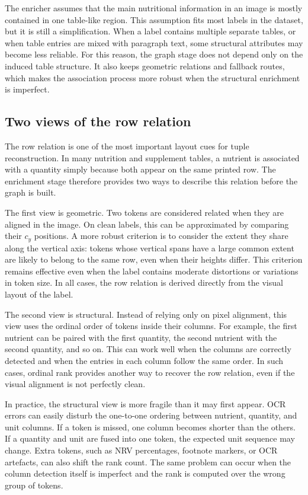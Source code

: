 The enricher assumes that the main nutritional information in an image is mostly contained in one table-like region. This assumption fits most labels in the dataset, but it is still a simplification. When a label contains multiple separate tables, or when table entries are mixed with paragraph text, some structural attributes may become less reliable. For this reason, the graph stage does not depend only on the induced table structure. It also keeps geometric relations and fallback routes, which makes the association process more robust when the structural enrichment is imperfect.

\subsection{Two views of the row relation}\label{sec:enrichment-rowviews}

The row relation is one of the most important layout cues for tuple reconstruction. In many nutrition and supplement tables, a nutrient is associated with a quantity simply because both appear on the same printed row. The enrichment stage therefore provides two ways to describe this relation before the graph is built.

The first view is geometric. Two tokens are considered related when they are aligned in the image. On clean labels, this can be approximated by comparing their \(c_y\) positions. A more robust criterion is to consider the extent they share along the vertical axis: tokens whose vertical spans have a large common extent are likely to belong to the same row, even when their heights differ. This criterion remains effective even when the label contains moderate distortions or variations in token size. In all cases, the row relation is derived directly from the visual layout of the label.

The second view is structural. Instead of relying only on pixel alignment, this view uses the ordinal order of tokens inside their columns. For example, the first nutrient can be paired with the first quantity, the second nutrient with the second quantity, and so on. This can work well when the columns are correctly detected and when the entries in each column follow the same order. In such cases, ordinal rank provides another way to recover the row relation, even if the visual alignment is not perfectly clean.

In practice, the structural view is more fragile than it may first appear. OCR errors can easily disturb the one-to-one ordering between nutrient, quantity, and unit columns. If a token is missed, one column becomes shorter than the others. If a quantity and unit are fused into one token, the expected unit sequence may change. Extra tokens, such as NRV percentages, footnote markers, or OCR artefacts, can also shift the rank count. The same problem can occur when the column detection itself is imperfect and the rank is computed over the wrong group of tokens.

